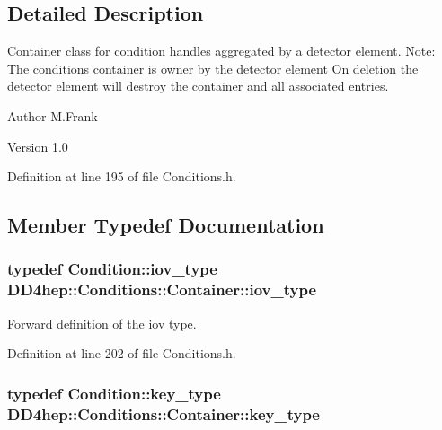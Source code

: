 \subsection{Detailed Description}
\hyperlink{class_d_d4hep_1_1_conditions_1_1_container}{Container} class for condition handles aggregated by a detector element. Note: The conditions container is owner by the detector element On deletion the detector element will destroy the container and all associated entries.

\begin{DoxyAuthor}{Author}
M.Frank 
\end{DoxyAuthor}
\begin{DoxyVersion}{Version}
1.0 
\end{DoxyVersion}


Definition at line 195 of file Conditions.h.

\subsection{Member Typedef Documentation}
\hypertarget{class_d_d4hep_1_1_conditions_1_1_container_a169b09fd183c9e05faf63429bad6c668}{
\subsubsection[{iov\_\-type}]{\setlength{\rightskip}{0pt plus 5cm}typedef {\bf Condition::iov\_\-type} {\bf DD4hep::Conditions::Container::iov\_\-type}}}
\label{class_d_d4hep_1_1_conditions_1_1_container_a169b09fd183c9e05faf63429bad6c668}


Forward definition of the iov type. 

Definition at line 202 of file Conditions.h.\hypertarget{class_d_d4hep_1_1_conditions_1_1_container_a65e62d9e4a43b9b0e9e46a7b80876a21}{
\subsubsection[{key\_\-type}]{\setlength{\rightskip}{0pt plus 5cm}typedef {\bf Condition::key\_\-type} {\bf DD4hep::Conditions::Container::key\_\-type}}}
\label{class_d_d4hep_1_1_conditions_1_1_container_a65e62d9e4a43b9b0e9e46a7b80876a21}



